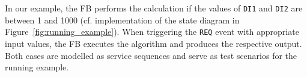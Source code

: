 In our example, the FB performs the calculation if the values of \texttt{DI1} and \texttt{DI2} are between 1 and 1000 (cf. implementation of the state diagram in Figure~\ref{fig:running_example}). When triggering the \texttt{REQ} event with appropriate input values, the FB executes the algorithm and produces the respective output. Both cases are modelled as service sequences and serve as test scenarios for the running example.

